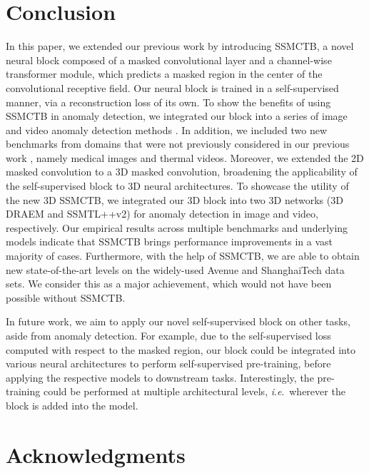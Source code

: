 \documentclass[10pt,journal,compsoc]{IEEEtran}
\newcommand{\ie}{\textit{i}.\textit{e}.}
\begin{document}
\section{Conclusion}

In this paper, we extended our previous work \cite{Ristea-CVPR-2022} by introducing SSMCTB, a novel neural block composed of a masked convolutional layer and a channel-wise transformer module, which predicts a masked region in the center of the convolutional receptive field. Our neural block is trained in a self-supervised manner, via a reconstruction loss of its own.
To show the benefits of using SSMCTB in anomaly detection, we integrated our block into a series of image and video anomaly detection methods \cite{Barbalau-ARXIV-2022, Zavrtanik-ICCV-2021, Schulter-ECCV-2022, Georgescu-TPAMI-2021, Liu-ICCV-2021, Park-CVPR-2020, Liu-CVPR-2018, He-CVPR-2022,Vasu-ICCV-2023,Wang-ICDM-2022}. In addition, we included two new benchmarks from domains that were not previously considered in our previous work \cite{Ristea-CVPR-2022}, namely medical images and thermal videos. Moreover, we extended the 2D masked convolution to a 3D masked convolution, broadening the applicability of the self-supervised block to 3D neural architectures. To showcase the utility of the new 3D SSMCTB, we integrated our 3D block into two 3D networks (3D DRAEM and SSMTL++v2) for anomaly detection in image and video, respectively.
Our empirical results across multiple benchmarks and underlying models indicate that SSMCTB brings performance improvements in a vast majority of cases. Furthermore, with the help of SSMCTB, we are able to obtain new state-of-the-art levels on the widely-used Avenue and ShanghaiTech data sets. We consider this as a major achievement, which would not have been possible without SSMCTB.

In future work, we aim to apply our novel self-supervised block on other tasks, aside from anomaly detection. For example, due to the self-supervised loss computed with respect to the masked region, our block could be integrated into various neural architectures to perform self-supervised pre-training, before applying the respective models to downstream tasks. Interestingly, the pre-training could be performed at multiple architectural levels, \ie~wherever the block is added into the model.


\ifCLASSOPTIONcompsoc
\section*{Acknowledgments}
\else
\end{document}
